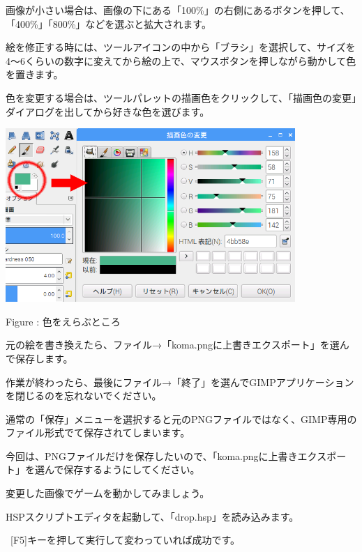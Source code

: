 \documentclass[a4paper,12pt]{jarticle}
\newcounter{Figure}
\renewcommand\theFigure{\arabic{Figure}}
\begin{document}
\bigskip
\bigskip
\bigskip

画像が小さい場合は、画像の下にある「100\%」の右側にあるボタンを押して、「400\%」「800\%」などを選ぶと拡大されます。

絵を修正する時には、ツールアイコンの中から「ブラシ」を選択して、サイズを4〜6くらいの数字に変えてから絵の上で、マウスボタンを押しながら動かして色を置きます。


\bigskip

色を変更する場合は、ツールパレットの描画色をクリックして、「描画色の変更」ダイアログを出してから好きな色を選びます。

\bigskip
\bigskip

\begin{minipage}{9.781cm}
\centering
{\upshape
\includegraphics[keepaspectratio,width=10.993cm,height=6.588cm]{text02-img/text02-img040.png}
\flushleft

Figure \stepcounter{Figure}{\theFigure}: 色をえらぶところ}
\end{minipage}

\bigskip
\bigskip
\bigskip

元の絵を書き換えたら、ファイル→「koma.pngに上書きエクスポート」を選んで保存します。

作業が終わったら、最後にファイル→「終了」を選んでGIMPアプリケーションを閉じるのを忘れないでください。

通常の「保存」メニューを選択すると元のPNGファイルではなく、GIMP専用のファイル形式でて保存されてしまいます。

今回は、PNGファイルだけを保存したいので、「koma.pngに上書きエクスポート」を選んで保存するようにしてください。

\bigskip

変更した画像でゲームを動かしてみましょう。

HSPスクリプトエディタを起動して、「drop.hsp」を読み込みます。

\ [F5]キーを押して実行して変わっていれば成功です。
\end{document}
